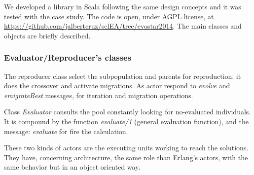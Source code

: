 
We developed a library in Scala following the same design concepts and it was tested with the case study. The code is open, under AGPL license, at \url{https://github.com/jalbertcruz/sclEA/tree/evostar2014}. The main classes and objects are briefly described.


\subsubsection{Evaluator/Reproducer's classes}

The reproducer class select the subpopulation and parents for reproduction, it does the crossover and activate migrations. As actor respond to {\em evolve} and {\em emigrateBest} messages, for iteration and migration operations.


Class {\em Evaluator} consults the pool constantly looking for no-evaluated individuals. It is compound by the function {\em evaluate/1} (general evaluation function), and the message: {\em evaluate} for fire the calculation.

These two kinds of actors are the executing units working to reach the solutions. They have, concerning architecture, the same role than Erlang’s actors, with the same behavior but in an object oriented way.
